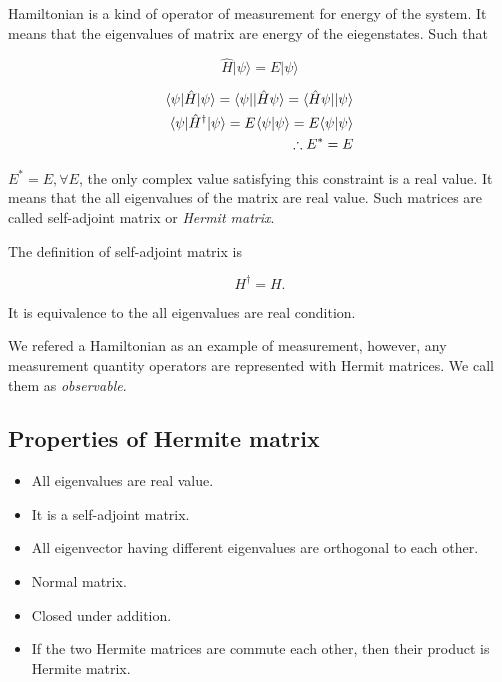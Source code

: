 Hamiltonian is a kind of operator of measurement for energy of the system. 
It means that the eigenvalues of matrix are energy of the eiegenstates.
Such that 

\begin{equation}
    \hat{H} | \psi \rangle = E | \psi \rangle
\end{equation}


\begin{eqnarray}
    \langle \psi | \hat{H} | \psi \rangle = \langle \psi | |\hat{H}\psi \rangle = \langle \hat{H} \psi | | \psi \rangle \\
    \langle \psi |\hat{H}^\dagger | \psi \rangle = E^{\*} \langle \psi | \psi \rangle = E \langle \psi | \psi \rangle \\
    \therefore E^{\ast} = E
\end{eqnarray}

$E^{\ast} = E, \forall E$, the only complex value satisfying this constraint is a real value.
It means that the all eigenvalues of the matrix are real value.
Such matrices are called self-adjoint matrix or \textit{Hermit matrix}.

The definition of self-adjoint matrix is 

\begin{equation}
    H^\dagger = H .
\end{equation}

It is equivalence to the all eigenvalues are real condition.

We refered a Hamiltonian as an example of measurement, 
however, any measurement quantity operators are represented with Hermit matrices.
We call them as \textit{observable}.

\subsection{Properties of Hermite matrix}

\begin{itemize}
    \item All eigenvalues are real value.
    \item It is a self-adjoint matrix.
    \item All eigenvector having different eigenvalues are orthogonal to each other.
    \item Normal matrix.
    \item Closed under addition.
    \item If the two Hermite matrices are commute each other, then their product is Hermite matrix.
\end{itemize}

